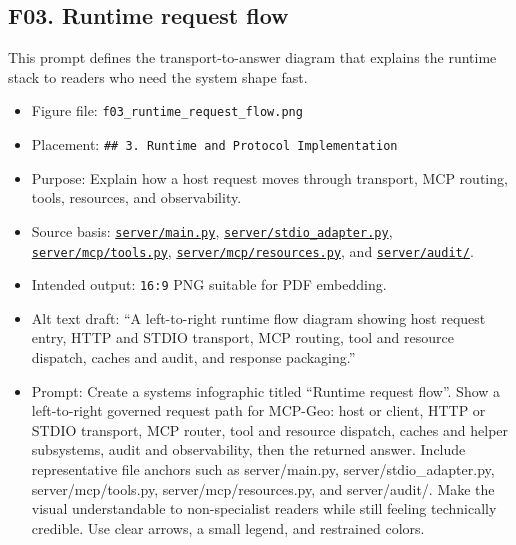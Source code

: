\subsection{F03. Runtime request flow}\label{f03.-runtime-request-flow}

This prompt defines the transport-to-answer diagram that explains the
runtime stack to readers who need the system shape fast.

\begin{itemize}
\tightlist
\item
  Figure file: \texttt{f03\_runtime\_request\_flow.png}
\item
  Placement: \texttt{\#\#\ 3.\ Runtime\ and\ Protocol\ Implementation}
\item
  Purpose: Explain how a host request moves through transport, MCP
  routing, tools, resources, and observability.
\item
  Source basis:
  \href{https://github.com/chris-page-gov/mcp-geo/blob/fe862910da246ca77f374cfbe484985f5df4d316/server/main.py}{\texttt{server/main.py}},
  \href{https://github.com/chris-page-gov/mcp-geo/blob/fe862910da246ca77f374cfbe484985f5df4d316/server/stdio_adapter.py}{\texttt{server/stdio\_adapter.py}},
  \href{https://github.com/chris-page-gov/mcp-geo/blob/fe862910da246ca77f374cfbe484985f5df4d316/server/mcp/tools.py}{\texttt{server/mcp/tools.py}},
  \href{https://github.com/chris-page-gov/mcp-geo/blob/fe862910da246ca77f374cfbe484985f5df4d316/server/mcp/resources.py}{\texttt{server/mcp/resources.py}},
  and
  \href{https://github.com/chris-page-gov/mcp-geo/tree/fe862910da246ca77f374cfbe484985f5df4d316/server/audit}{\texttt{server/audit/}}.
\item
  Intended output: \texttt{16:9} PNG suitable for PDF embedding.
\item
  Alt text draft: ``A left-to-right runtime flow diagram showing host
  request entry, HTTP and STDIO transport, MCP routing, tool and
  resource dispatch, caches and audit, and response packaging.''
\item
  Prompt: Create a systems infographic titled ``Runtime request flow''.
  Show a left-to-right governed request path for MCP-Geo: host or
  client, HTTP or STDIO transport, MCP router, tool and resource
  dispatch, caches and helper subsystems, audit and observability, then
  the returned answer. Include representative file anchors such as
  server/main.py, server/stdio\_adapter.py, server/mcp/tools.py,
  server/mcp/resources.py, and server/audit/. Make the visual
  understandable to non-specialist readers while still feeling
  technically credible. Use clear arrows, a small legend, and restrained
  colors.
\end{itemize}

